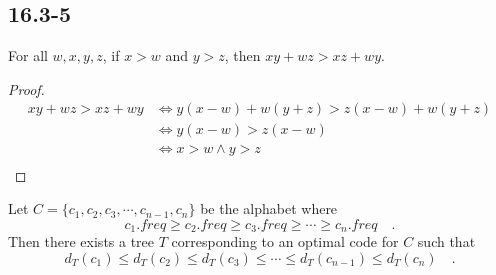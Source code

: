 \subsection*{16.3-5}

\begin{lemma}
    For all $w,x,y,z$, if $x > w$ and $y > z$, then $xy + wz > xz + wy$.
\end{lemma}

\begin{proof}
    \begin{equation*}
    \begin{split}
        xy + wz > xz + wy & \Longleftrightarrow 
        y(x - w) + w(y + z) > z(x - w) + w(y + z) \\
        & \Longleftrightarrow y(x - w) > z(x - w) \\
        & \Longleftrightarrow x > w \wedge y > z \\
    \end{split}
    \end{equation*}
\end{proof}

\begin{claim}
    Let $C = \{ c_1, c_2, c_3, \cdots, c_{n-1}, c_n \}$
    be the alphabet where 
    \begin{equation*}
        c_1.freq \geq c_2.freq \geq c_3.freq \geq 
        \cdots \geq c_n.freq
        \quad .
    \end{equation*}
    Then there exists a tree $T$ corresponding to an optimal code
    for $C$ such that 
    \begin{equation*}
        d_T(c_1) \leq d_T(c_2) \leq d_T(c_3) \leq 
        \cdots \leq d_T(c_{n-1}) \leq d_T(c_n)
        \quad .
    \end{equation*}
\end{claim}

